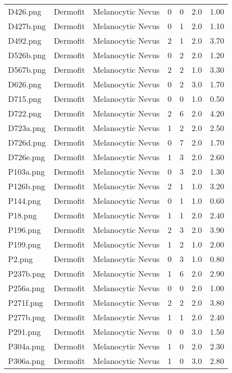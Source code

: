 \begin{longtable}{ | l | l | l | l | l | l | l |}
D426.png & Dermofit & Melanocytic Nevus & 0 & 0 & 2.0 & 1.00 \\ 
D427b.png & Dermofit & Melanocytic Nevus & 0 & 1 & 2.0 & 1.10 \\ 
D492.png & Dermofit & Melanocytic Nevus & 2 & 1 & 2.0 & 3.70 \\ 
D526b.png & Dermofit & Melanocytic Nevus & 0 & 2 & 2.0 & 1.20 \\ 
D567b.png & Dermofit & Melanocytic Nevus & 2 & 2 & 1.0 & 3.30 \\ 
D626.png & Dermofit & Melanocytic Nevus & 0 & 2 & 3.0 & 1.70 \\ 
D715.png & Dermofit & Melanocytic Nevus & 0 & 0 & 1.0 & 0.50 \\ 
D722.png & Dermofit & Melanocytic Nevus & 2 & 6 & 2.0 & 4.20 \\ 
D723a.png & Dermofit & Melanocytic Nevus & 1 & 2 & 2.0 & 2.50 \\ 
D726d.png & Dermofit & Melanocytic Nevus & 0 & 7 & 2.0 & 1.70 \\ 
D726e.png & Dermofit & Melanocytic Nevus & 1 & 3 & 2.0 & 2.60 \\ 
P103a.png & Dermofit & Melanocytic Nevus & 0 & 3 & 2.0 & 1.30 \\ 
P126b.png & Dermofit & Melanocytic Nevus & 2 & 1 & 1.0 & 3.20 \\ 
P144.png & Dermofit & Melanocytic Nevus & 0 & 1 & 1.0 & 0.60 \\ 
P18.png & Dermofit & Melanocytic Nevus & 1 & 1 & 2.0 & 2.40 \\ 
P196.png & Dermofit & Melanocytic Nevus & 2 & 3 & 2.0 & 3.90 \\ 
P199.png & Dermofit & Melanocytic Nevus & 1 & 2 & 1.0 & 2.00 \\ 
P2.png & Dermofit & Melanocytic Nevus & 0 & 3 & 1.0 & 0.80 \\ 
P237b.png & Dermofit & Melanocytic Nevus & 1 & 6 & 2.0 & 2.90 \\ 
P256a.png & Dermofit & Melanocytic Nevus & 0 & 0 & 2.0 & 1.00 \\ 
P271f.png & Dermofit & Melanocytic Nevus & 2 & 2 & 2.0 & 3.80 \\ 
P277b.png & Dermofit & Melanocytic Nevus & 1 & 1 & 2.0 & 2.40 \\ 
P291.png & Dermofit & Melanocytic Nevus & 0 & 0 & 3.0 & 1.50 \\ 
P304a.png & Dermofit & Melanocytic Nevus & 1 & 0 & 2.0 & 2.30 \\ 
P306a.png & Dermofit & Melanocytic Nevus & 1 & 0 & 3.0 & 2.80 \\ 

\end{longtable}
